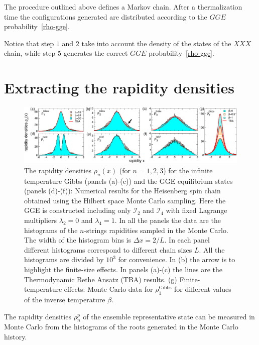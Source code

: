 \documentclass[twocolumn,superscriptaddress,prb,10pt]{revtex4-1}
\begin{document}
The procedure outlined above defines a Markov chain. After a thermalization time the 
configurations generated are distributed according to the $GGE$ probability~\eqref{rho-gge}. 

Notice that step $1$ and $2$ take into account the density of the states of the $XXX$ 
chain, while step $5$ generates the correct $GGE$ probability~\eqref{rho-gge}. 

\section{Extracting the rapidity densities}

\begin{figure}[t]
\includegraphics*[width=0.99\linewidth]{./draft_figs/fig2}
\caption{The rapidity densities $\rho_n(x)$ (for $n=1,2,3$) for the infinite temperature 
 Gibbs (panels (a)-(c)) and the GGE equilibrium states (panels (d)-(f)): Numerical  
 results for the Heisenberg spin chain obtained using the Hilbert space Monte Carlo 
 sampling. Here the GGE is constructed including only ${\mathcal I}_2$ and ${\mathcal I}_4$ 
 with fixed Lagrange multipliers $\lambda_2=0$ and $\lambda_4=1$. In all the panels the 
 data are the histograms of the $n$-strings rapidities sampled in the Monte Carlo.
 The width of the histogram bins is $\Delta x=2/L$. In each panel different histograms 
 correspond to different chain sizes $L$. All the histograms are divided by $10^3$ for 
 convenience. In (b) the arrow is to highlight the finite-size effects. In panels (a)-(c) 
 the lines are the Thermodynamic Bethe Ansatz (TBA) results. (g) Finite-temperature 
 effects: Monte Carlo data for $\rho^{\textrm{Gibbs}}_1$ for different values of the 
 inverse temperature $\beta$.
}
\label{fig1}
\end{figure}

The rapidity densities $\rho_n^p$ of the ensemble representative state can be measured  
in Monte Carlo from the histograms of the roots generated in the Monte Carlo history.  
\end{document}
